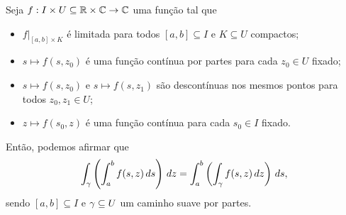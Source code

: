 \begin{teorema}
\label{teo-fubini-integrais-complexas}
Seja $f:I\times U \subseteq \mathbb{R}\times\mathbb{C} \to\mathbb{C}$ uma função tal que
%
\begin{itemize}
    \item $f\big|_{[a,b]\times K}$ é limitada para todos $[a,b]\subseteq I$ e $K\subseteq U$
    compactos;
    \item $s\mapsto f(s, z_0)$ é uma função contínua por partes para cada $z_0\in U$ fixado;
    \item $s\mapsto f(s, z_0)$ e $s\mapsto f(s, z_1)$ são descontínuas nos mesmos pontos
    para todos $z_0, z_1\in U$;
    \item $z\mapsto f(s_0, z)$ é uma função contínua para cada $s_0\in I$ fixado.
\end{itemize}
%
Então, podemos afirmar que
%
\[
\int_{\gamma} \left( \int_a^b f(s,z) \, ds \right) \, dz 
= \int_a^b \left( \int_{\gamma} f(s,z) \, dz \right) \, ds,
\]
%
sendo $[a,b]\subseteq I$ e $\gamma\subseteq U$ um caminho suave por partes.
\end{teorema}
%
